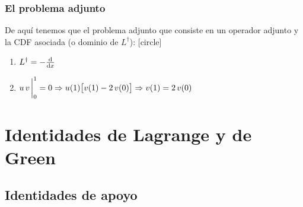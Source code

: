 \documentclass[12pt]{beamer}
\begin{document}
\begin{frame}
\frametitle{El problema adjunto}
De aquí tenemos que el problema adjunto que consiste en un operador adjunto y la CDF asociada (o dominio de $L^{\dagger}$):
\pause
{}
[circle]
\begin{enumerate}[<+->]
\item $L^{\dagger} = - \dv{x}$
\item $\displaystyle u \, v \eval_{0}^{1} = 0 \Rightarrow u(1) \big[ v(1) - 2 \, v(0) \big] \Rightarrow v(1) = 2 \, v(0)$
\end{enumerate}
\end{frame}


\section{Identidades de Lagrange y de Green}
\subsection{Identidades de apoyo}
\end{document}
